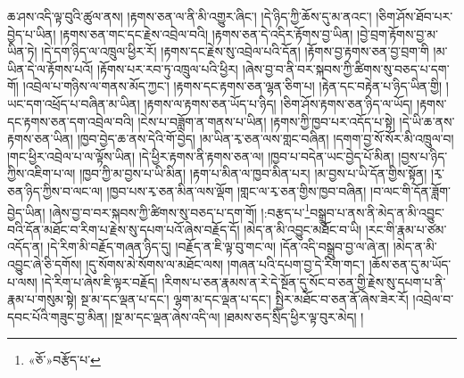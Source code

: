 ཆ་ཤས་འདི་ལྟ་བུའི་ཚུལ་ནས། །རྟགས་ཅན་ལ་ནི་མི་འགྱུར་ཞིང་། །དེ་ཉིད་ཀྱི་ཆོས་དུ་མ་ནའང་། །ཅིག་ཤོས་ཐོབ་པར་བྱེད་པ་ཡིན། །རྟགས་ཅན་གང་དང་རྗེས་འབྲེལ་བའི། །རྟགས་ཅན་དེ་འདིར་རྟོགས་བྱ་ཡིན། །བྱེ་བྲག་རྟོགས་བྱ་མ་ཡིན་ཏེ། །དེ་དག་ཉིད་ལ་འཁྲུལ་ཕྱིར་རོ། །རྟགས་དང་རྗེས་སུ་འབྲེལ་པའི་དོན། །རྟོགས་བྱ་རྟགས་ཅན་བྱ་བྲག་གི །མ་ཡིན་དེ་ལ་རྟོགས་པའོ། །རྟོགས་པར་རབ་ཏུ་འཁྲུལ་པའི་ཕྱིར། །ཞེས་བྱ་བ་ནི་བར་སྐབས་ཀྱི་ཚིགས་སུ་བཅད་པ་དག་གོ། །འབྲེལ་པ་གཉིས་ལ་གནས་མོད་ཀྱང་། །རྟགས་དང་རྟགས་ཅན་ལྷན་ཅིག་པ། །རྟེན་དང་བརྟེན་པ་ཉིད་ཡིན་གྱི། །ཡང་དག་འཕྲོད་པ་བཞིན་མ་ཡིན། །རྟགས་ལ་རྟགས་ཅན་ཡོད་པ་ཉིད། །ཅིག་ཤོས་རྟགས་ཅན་ཉིད་ལ་ཡོད། །རྟགས་དང་རྟགས་ཅན་དག་འབྲེལ་བའི། །ངེས་པ་བཟློག་ན་གནས་པ་ཡིན། །རྟགས་ཀྱི་ཁྱབ་པར་འདོད་པ་སྟེ། །དེ་ཡི་ཆ་ནས་རྟགས་ཅན་ཡིན། །ཁྱབ་བྱེད་ཆ་ནས་དེའི་གོ་བྱེད། །མ་ཡིན་རྭ་ཅན་ལས་གླང་བཞིན། །དགག་བྱ་སོ་སོར་མི་འཁྲུལ་བ། །གང་ཕྱིར་འབྲེལ་པ་ལ་ལྟོས་ཡིན། །དེ་ཕྱིར་རྟགས་ནི་རྟགས་ཅན་ལ། །ཁྱབ་པ་བདེན་ཡང་བྱེད་པོ་མིན། །བྱས་པ་ཉིད་ཀྱིས་འཇིག་པ་ལ། །ཁྱབ་ཀྱི་མ་བྱས་པ་ཡི་མིན། །རྟག་པ་མིན་ལ་ཁྱབ་མིན་པར། །མ་བྱས་པ་ཡི་དོན་གྱིས་སྟོན། །རྭ་ཅན་ཉིད་ཀྱིས་བ་ལང་ལ། །ཁྱབ་པས་རྭ་ཅན་མིན་ལས་ལྡོག །གླང་ལ་རྭ་ཅན་གྱིས་ཁྱབ་བཞིན། །བ་ལང་གི་དོན་ཟློག་བྱེད་ཡིན། །ཞེས་བྱ་བ་བར་སྐབས་ཀྱི་ཚིགས་སུ་བཅད་པ་དག་གོ། །:བརྩད་པ་\footnote{«ཅོ་»བརྩོད་པ་}བསྒྲུབ་པ་ནས་ནི་མེད་ན་མི་འབྱུང་བའི་དོན་མཐོང་བ་རིག་པ་རྗེས་སུ་དཔག་པའོ་ཞེས་བརྗོད་དོ། །མེད་ན་མི་འབྱུང་མཐོང་བ་ཡི། །རང་གི་རྣམ་པ་ཙམ་འདོད་ན། །དེ་རིག་མི་བརྗོད་གཞན་ཉིད་དུ། །བརྗོད་ན་ཇི་ལྟ་བུ་གང་ལ། །དོན་འདི་བསྒྲུབ་བྱ་ལ་ཞེ་ན། །མེད་ན་མི་འབྱུང་ཞེ་ཅི་དགོས། །དུ་སོགས་མེ་སོགས་ལ་མཐོང་ལས། །གཞན་པའི་དཔག་བྱ་དེ་རིག་གང་། །ཆོས་ཅན་དུ་མ་ཡོད་པ་ལས། །དེ་རིག་པ་ཞེས་ཇི་ལྟར་བརྗོད། །རིགས་པ་ཅན་རྣམས་ན་རེ་དེ་སྔོན་དུ་སོང་བ་ཅན་གྱི་རྗེས་སུ་དཔག་པ་ནི་རྣམ་པ་གསུམ་སྟེ། སྔ་མ་དང་ལྡན་པ་དང་། ལྷག་མ་དང་ལྡན་པ་དང་། སྤྱིར་མཐོང་བ་ཅན་ནོ་ཞེས་ཟེར་རོ། །འབྲེལ་བ་དབང་པོའི་གཟུང་བྱ་མིན། །སྔ་མ་དང་ལྡན་ཞེས་འདི་ལ། །ཐམས་ཅད་སྲིད་ཕྱིར་ལྟ་བུར་མེད། །
